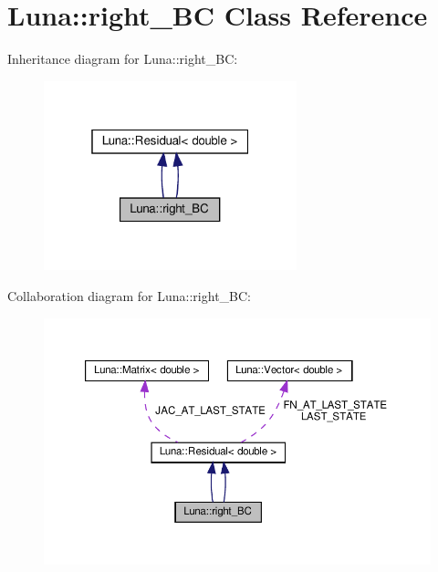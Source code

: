 \hypertarget{classLuna_1_1right__BC}{}\section{Luna\+:\+:right\+\_\+\+BC Class Reference}
\label{classLuna_1_1right__BC}


Inheritance diagram for Luna\+:\+:right\+\_\+\+BC\+:\nopagebreak
\begin{figure}[H]
\begin{center}
\leavevmode
\includegraphics[width=208pt]{classLuna_1_1right__BC__inherit__graph}
\end{center}
\end{figure}


Collaboration diagram for Luna\+:\+:right\+\_\+\+BC\+:\nopagebreak
\begin{figure}[H]
\begin{center}
\leavevmode
\includegraphics[width=350pt]{classLuna_1_1right__BC__coll__graph}
\end{center}
\end{figure}
